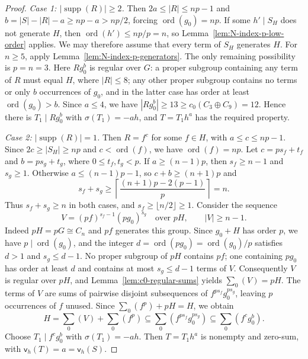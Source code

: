 \documentclass[10pt,a4paper]{amsart}
\theoremstyle{definition}
\theoremstyle{remark}
\numberwithin{equation}{section}
\DeclareMathOperator{\ord}{ord}
\DeclareMathOperator{\supp}{supp}
\begin{document}
\begin{proof}
\smallskip\noindent\emph{Case 1: $|\supp(R)|\ge2$.}
Then $2a\le|R|\le np-1$ and
$b=|S|-|R|-a\ge np-a>np/2$, forcing $\ord(g_0)=np$.
If some $h'\mid S_H$ does not generate $H$, then
$\ord(h')\le np/p=n$, so Lemma~\ref{lem:N-index-p-low-order} applies.
We may therefore assume that every term of $S_H$ generates $H$.
For $n\ge5$, apply Lemma~\ref{lem:N-index-p-generators}.
The only remaining possibility is $p=n=3$.
Here $Rg_0^b$ is regular over $G$: a proper subgroup containing
any term of $R$ must equal $H$, where $|R|\le8$; any other proper
subgroup contains no terms or only $b$ occurrences of $g_0$,
and in the latter case has order at least $\ord(g_0)>b$.
Since $a\le4$, we have $|Rg_0^b|\ge13\ge c_0(C_3\oplus C_9)=12$.
Hence there is $T_1\mid Rg_0^b$ with $\sigma(T_1)=-ah$,
and $T=T_1h^a$ has the required property.

\smallskip\noindent\emph{Case 2: $|\supp(R)|=1$.}
Then $R=f^c$ for some $f\in H$, with $a\le c\le np-1$.
Since $2c\ge|S_H|\ge np$ and $c<\ord(f)$, we have $\ord(f)=np$.
Let $c=ps_f+t_f$ and $b=ps_g+t_g$, where $0\le t_f,t_g<p$.
If $a\ge(n-1)p$, then $s_f\ge n-1$ and $s_g\ge1$.
Otherwise $a\le(n-1)p-1$, so $c+b\ge(n+1)p$ and
\[
 s_f+s_g\ge
 \left\lceil\frac{(n+1)p-2(p-1)}p\right\rceil=n.
\]
Thus $s_f+s_g\ge n$ in both cases, and $s_f\ge\lfloor n/2\rfloor\ge1$.
Consider the sequence
\[
 V=(pf)^{s_f-1}(pg_0)^{s_g}\quad\text{over }pH,
 \qquad |V|\ge n-1.
\]
Indeed $pH=pG\cong C_n$ and $pf$ generates this group.
Since $g_0+H$ has order $p$, we have $p\mid\ord(g_0)$, and the integer
$d=\ord(pg_0)=\ord(g_0)/p$ satisfies $d>1$ and $s_g\le d-1$.
No proper subgroup of $pH$ contains $pf$; one containing $pg_0$
has order at least $d$ and contains at most $s_g\le d-1$ terms of $V$.
Consequently $V$ is regular over $pH$, and
Lemma~\ref{lem:c0-regular-sums} yields $\sum_0(V)=pH$.
The terms of $V$ are sums of pairwise disjoint subsequences of
$f^{ps_f}g_0^{ps_g}$, leaving $p$ occurrences of $f$ unused.
Since $\sum_0(f^p)+pH=H$, we obtain
\[
 H=\sum_0(V)+\sum_0(f^p)
 \subseteq\sum_0(f^{ps_f}g_0^{ps_g})
 \subseteq\sum_0(f^cg_0^b).
\]
Choose $T_1\mid f^cg_0^b$ with $\sigma(T_1)=-ah$.
Then $T=T_1h^a$ is nonempty and zero-sum, with $\mathsf v_h(T)=a=\mathsf v_h(S)$.
\end{proof}
\end{document}
